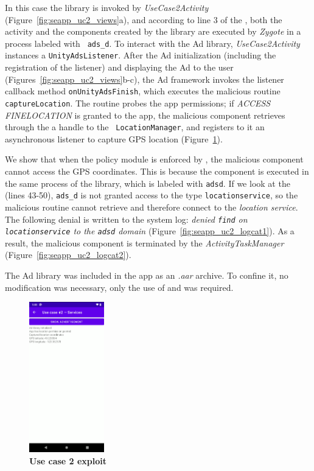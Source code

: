 In this case the library is invoked by {\em UseCase2Activity}
(Figure~\ref{fig:seapp_uc2_views}a), and according to line 3 of the
\seappcontexts, both the activity and the components created by the
library are executed by {\em Zygote} in a process labeled with {\tt
  ads\_d}.  To interact with the Ad library, {\em UseCase2Activity}
instances a {\tt UnityAdsListener}.  After the Ad initialization
(including the registration of the listener) and displaying the Ad to
the user (Figures~\ref{fig:seapp_uc2_views}b-c), the Ad framework
invokes the listener callback method {\tt onUnityAdsFinish}, which
executes the malicious routine {\tt captureLocation}. The routine
probes the app permissions; if {\em ACCESS\textunderscore
  FINE\textunderscore LOCATION} is granted to the app, the malicious
component retrieves through the \servicemanager a handle to the {\tt
  LocationManager}, and registers to it an asynchronous listener to
capture GPS location (Figure~\ref{fig:seapp_uc2_exploit}).

We show that when the policy module is enforced by \pap, the malicious
component cannot access the GPS coordinates. This is because the
component is executed in the same process of the library, which is
labeled with {\tt ads\textunderscore d}. If we look at the \sepolicy
(lines 43-50), {\tt ads\_d} is not granted access to the \sel type
{\tt location\textunderscore service}, so the malicious routine cannot
retrieve and therefore connect to the {\em location\textunderscore
  service}.  The following denial is written to the system log: {\em
  denied {\tt find} on {\tt location\textunderscore service} to the
  {\tt ads\textunderscore d} domain}
(Figure~\ref{fig:seapp_uc2_logcat1}). As a result, the malicious
component is terminated by the {\em ActivityTaskManager}
(Figure~\ref{fig:seapp_uc2_logcat2}).

The Ad library was included in the app as an {\em .aar}
archive. To confine it, no modification was necessary, only
the use of \manifest and \sepolicy was required.

\begin{figure}[h]
  \centering
\includegraphics[width=0.29\textwidth]{chapters/seapp/figs/ae/uc24.png}
  \caption{\label{fig:seapp_uc2_exploit}\bf Use case 2 exploit}  
\end{figure}  

